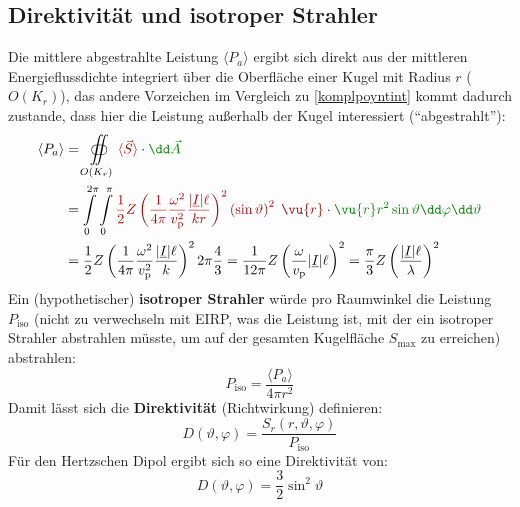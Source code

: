   \subsection{Direktivität und isotroper Strahler}
		  Die mittlere abgestrahlte Leistung \(\langle P_a \rangle\) ergibt sich direkt aus der mittleren Energieflussdichte integriert über die Oberfläche einer Kugel mit Radius \(r\) (\(O(K_r)\)), das andere Vorzeichen im Vergleich zu \ref{komplpoyntint} kommt dadurch zustande, dass hier die Leistung außerhalb der Kugel interessiert (\enquote{abgestrahlt}):
		        \begin{equation}\begin{split}
				        \langle P_a \rangle &= \oiint\limits_{O(K_r)} \textcolor{red}{\langle \vec{S} \rangle} \cdot \textcolor{green}{\dd\vec{A}} \\
				        &= \int\limits_0^{2\pi}\int\limits_0^\pi \textcolor{red}{\frac{1}{2} Z \left( \frac{1}{4\pi} \frac{\omega^2}{ v_\mathrm{p}^2}\frac{|\underline{I}| \ell}{ kr} \right)^2 \left(\sin\vartheta\right)^2 \; \vu{r}} \cdot \textcolor{green}{\vu{r} r^2\sin\vartheta \dd\varphi\dd\vartheta}  \\
				        &= \frac{1}{2} Z \left( \frac{1}{4\pi} \frac{\omega^2}{ v_\mathrm{p}^2}\frac{|\underline{I}| \ell}{ k} \right)^2 2\pi \frac{4}{3} = \frac{1}{12\pi} Z \left( \frac{\omega}{ v_\mathrm{p}}|\underline{I}| \ell \right)^2 = \frac{\pi}{3} Z \left( \frac{|\underline{I}| \ell}{\lambda} \right)^2
			        \end{split}\end{equation}
		  Ein (hypothetischer) \textbf{isotroper Strahler} würde pro Raumwinkel die Leistung  $P_\mathrm{iso}$ (nicht zu verwechseln mit EIRP, was die Leistung ist, mit der ein isotroper Strahler abstrahlen müsste, um auf der gesamten Kugelfläche $S_\mathrm{max}$ zu erreichen) abstrahlen:
		  \begin{equation}
		  \boxed{P_\mathrm{iso}= \frac{\langle P_a \rangle}{4\pi r^2} }
		  		  \end{equation} 
		  		  Damit lässt sich die \textbf{Direktivität} (Richtwirkung) definieren:
		  		  \begin{equation}
		  		  	\boxed{D(\vartheta,\varphi) = \frac{S_r(r,\vartheta, \varphi)}{P_\mathrm{iso}}}
		  		  \end{equation}
		   Für den Hertzschen Dipol ergibt sich so eine Direktivität von:
		        \begin{equation}
			        D(\vartheta,\varphi)  = \frac{3}{2} \sin^2\vartheta 
		        \end{equation}
